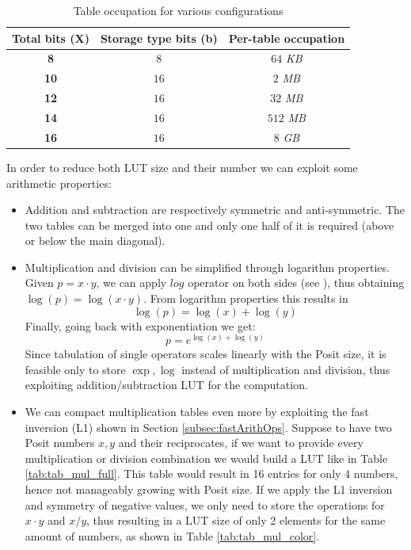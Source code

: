 \begin{table}[H]
\centering
\caption{Table occupation for various configurations}
\label{tab:table_occup}
\begin{tabular}{ccc}
\hline \textbf{Total bits (X)}
           & \textbf{Storage type bits (b)}   
           & \textbf{Per-table occupation}
\\ \hline
 \textbf{8} & $8$ & $64$ \textit{KB}\\ \hline
 \textbf{10} & $16$ & $2$ \textit{MB} \\ \hline
 \textbf{12}& $16$ & $32$ \textit{MB} \\ \hline
 \textbf{14}& $16$ & $512$ \textit{MB}\\ \hline
  \textbf{16} & $16$ & $8$ \textit{GB}\\ \hline
\end{tabular}
\end{table}


In order to reduce both LUT size and their number we can exploit some arithmetic properties:
\begin{itemize}
    \item Addition and subtraction are respectively symmetric and anti-symmetric. The two tables can be merged into one and only one half of it is required (above or below the main diagonal).
    \item Multiplication and division can be simplified through logarithm properties. Given $p=x\cdot y$, we can apply $log$ operator on both sides (see \cite{arnold2003interval}), thus obtaining $\log(p) = \log(x\cdot y)$. From logarithm properties this results in \[\log(p) = \log(x)+\log(y)\] Finally, going back with exponentiation we get: \[ p = e^{\log(x)+\log(y)} \] Since tabulation of single operators scales linearly with the Posit size, it is feasible only to store $\exp,\log$ instead of multiplication and division, thus exploiting addition/subtraction LUT for the computation. 
    \item We can compact multiplication tables even more by exploiting the fast inversion (L1) shown in Section \ref{subsec:fastArithOps}. Suppose to have two Posit numbers $x,y$ and their reciprocates, if we want to provide every multiplication or division combination we would build a LUT like in Table \ref{tab:tab_mul_full}. This table would result in 16 entries for only 4 numbers, hence not manageably growing with Posit size. If we apply the L1 inversion and symmetry of negative values, we only need to store the operations for $x\cdot y$ and $x/y$, thus resulting in a LUT size of only 2 elements for the same amount of numbers, as shown in Table \ref{tab:tab_mul_color}.
\end{itemize}

